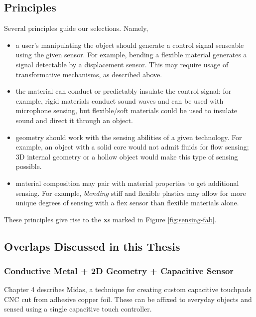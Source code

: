 \subsection{Principles}
    
    Several principles guide our selections. Namely,
    \begin{itemize}
        \item a user's manipulating the object should generate a control signal senseable using the given sensor. For example, bending a flexible material generates a signal detectable by a displacement sensor. This may require usage of transformative mechanisms, as described above.
    
        \item the material can conduct or predictably insulate the control signal: for example, rigid materials conduct sound waves and can be used with microphone sensing, but flexible/soft materials could be used to insulate sound and direct it through an object.
    
        \item geometry should work with the sensing abilities of a given technology. For example, an object with a solid core would not admit fluids for flow sensing; 3D internal geometry or a hollow object would make this type of sensing possible.
      
        \item material composition may pair with material properties to get additional sensing. For example, \emph{blending} stiff and flexible plastics may allow for more unique degrees of sensing with a flex sensor than flexible materials alone. 
    \end{itemize}
    
    These principles give rise to the \textbf{x}s marked in Figure \ref{fig:sensing-fab}.
    
\subsection{Overlaps Discussed in this Thesis}

    \subsubsection{Conductive Metal + 2D Geometry + Capacitive Sensor}
    
    Chapter 4 describes Midas, a technique for creating custom capacitive touchpads CNC cut from adhesive copper foil. These can be affixed to everyday objects and sensed using a single capacitive touch controller.
    
